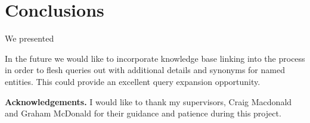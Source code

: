 \documentclass{mpaper}
\begin{document}
\begin{center}
\begin{table}[h]
\centering
{}
\caption{Basic Textual Query Results Using Different Models}
\label{plain_results}
\end{table}
\end{center}

\section{Conclusions} \label{sec:conclusion}
We presented


In the future we would like to incorporate knowledge base linking into the process in order to flesh queries out with additional details and synonyms for named entities. This could provide an excellent query expansion opportunity.

\vskip8pt \noindent
{\bf Acknowledgements.}
I would like to thank my supervisors, Craig Macdonald and Graham McDonald for their guidance and patience during this project.


\end{document}
